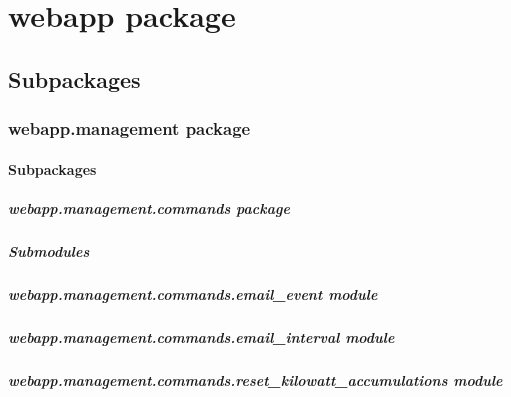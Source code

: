 \documentclass[letterpaper,10pt,english]{sphinxmanual}
\begin{document}
\section{webapp package}
\label{modules/webapp::doc}\label{modules/webapp:webapp-package}

\subsection{Subpackages}
\label{modules/webapp:subpackages}

\subsubsection{webapp.management package}
\label{modules/webapp.management::doc}\label{modules/webapp.management:webapp-management-package}

\paragraph{Subpackages}
\label{modules/webapp.management:subpackages}

\subparagraph{webapp.management.commands package}
\label{modules/webapp.management.commands::doc}\label{modules/webapp.management.commands:webapp-management-commands-package}

\subparagraph{Submodules}
\label{modules/webapp.management.commands:submodules}

\subparagraph{webapp.management.commands.email\_event module}
\label{modules/webapp.management.commands:webapp-management-commands-email-event-module}

\subparagraph{webapp.management.commands.email\_interval module}
\label{modules/webapp.management.commands:webapp-management-commands-email-interval-module}

\subparagraph{webapp.management.commands.reset\_kilowatt\_accumulations module}
\label{modules/webapp.management.commands:module-webapp.management.commands.reset_kilowatt_accumulations}\label{modules/webapp.management.commands:webapp-management-commands-reset-kilowatt-accumulations-module}
\end{document}
